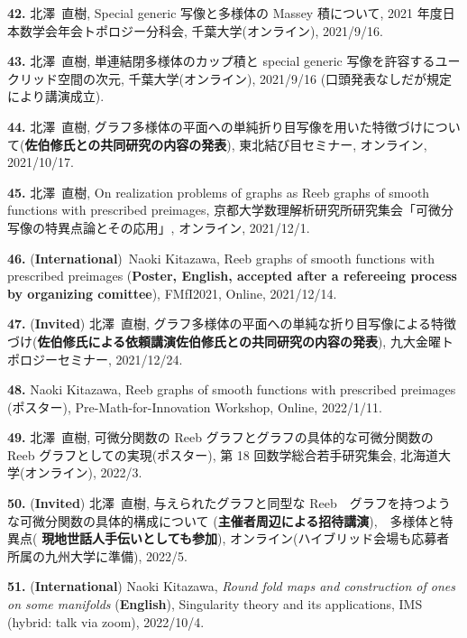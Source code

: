\documentclass{article}
\begin{document}
\par\noindent
{\bf 42.} 北澤\ 直樹, Special generic 写像と多様体の Massey 積について, 2021 年度日本数学会年会トポロジー分科会, 千葉大学(オンライン), 2021/9/16.

\par\noindent
{\bf 43.} 北澤\ 直樹, 単連結閉多様体のカップ積と special generic 写像を許容するユークリッド空間の次元, 千葉大学(オンライン), 2021/9/16 (口頭発表なしだが規定により講演成立).

\par\noindent
{\bf 44.} 北澤\ 直樹, グラフ多様体の平面への単純折り目写像を用いた特徴づけについて({\bf 佐伯修氏との共同研究の内容の発表}), 東北結び目セミナー, オンライン, 2021/10/17.

\par\noindent
{\bf 45.} 北澤\ 直樹, On realization problems of graphs as Reeb graphs of smooth functions with prescribed preimages, 京都大学数理解析研究所研究集会「可微分写像の特異点論とその応用」, オンライン, 2021/12/1.

\par\noindent
{\bf 46.} ({\bf International})\ Naoki Kitazawa, Reeb graphs of smooth functions with prescribed preimages ({\bf Poster, English, accepted after a refereeing process by organizing comittee}), FMfI2021, Online, 2021/12/14.

\par\noindent
{\bf 47.}  ({\bf  Invited}) 北澤\ 直樹, グラフ多様体の平面への単純な折り目写像による特徴づけ({\bf 佐伯修氏による依頼講演佐伯修氏との共同研究の内容の発表}), 九大金曜トポロジーセミナー, 2021/12/24.

\par\noindent
{\bf 48.}  Naoki Kitazawa, Reeb graphs of smooth functions with prescribed preimages (ポスター), Pre-Math-for-Innovation Workshop, Online, 2022/1/11.

\par\noindent
{\bf 49.} 北澤\ 直樹, 可微分関数の Reeb グラフとグラフの具体的な可微分関数の Reeb グラフとしての実現(ポスター), 第 18 回数学総合若手研究集会, 北海道大学(オンライン), 2022/3.

\par\noindent
{\bf 50.}  ({\bf  Invited}) 北澤\ 直樹, 与えられたグラフと同型な Reeb　グラフを持つような可微分関数の具体的構成について ({\bf 主催者周辺による招待講演}),　多様体と特異点({\bf
	現地世話人手伝いとしても参加}), オンライン(ハイブリッド会場も応募者所属の九州大学に準備), 2022/5.

\par\noindent
{\bf 51.} ({\bf International}) Naoki Kitazawa, \textsl{Round fold maps and construction of ones on some manifolds} ({\bf English}), Singularity theory and its applications, IMS (hybrid: talk via zoom), 2022/10/4.
\end{document}

